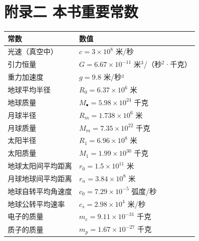 \chapter{附录二
本书重要常数}\label{ux9644ux5f55ux4e8c-ux672cux4e66ux91cdux8981ux5e38ux6570}

{\def\LTcaptype{none} %
\begin{longtable}[]{@{}
  >{\raggedright\arraybackslash}p{}
  >{\raggedright\arraybackslash}p{}@{}}
\toprule\noalign{}
\begin{minipage}[b]{\linewidth}\raggedright
常数
\end{minipage} & \begin{minipage}[b]{\linewidth}\raggedright
数值
\end{minipage} \\
\midrule\noalign{}
\endhead
\bottomrule\noalign{}
\endlastfoot
光速（真空中） & \(c = 3 \times 10^{8}\) 米/秒 \\
引力恒量 & \(G = 6.67 \times 10^{-11}\)
米\(^{3}\)/（秒\(^{2}\)·千克） \\
重力加速度 & \(g = 9.8\) 米/秒² \\
地球平均半径 & \(R_{0} = 6.37 \times 10^{6}\) 米 \\
地球质量 & \(M_{\bullet} = 5.98 \times 10^{24}\) 千克 \\
月球半径 & \(R_{m} = 1.738 \times 10^{6}\) 米 \\
月球质量 & \(M_{m} = 7.35 \times 10^{22}\) 千克 \\
太阳半径 & \(R_{1} = 6.96 \times 10^{8}\) 米 \\
太阳质量 & \(M_{1} = 1.99 \times 10^{30}\) 千克 \\
地球太阳间平均距离 & \(r_{0} = 1.5 \times 10^{11}\) 米 \\
月球地球间平均距离 & \(r_{n} = 3.84 \times 10^{8}\) 米 \\
地球自转平均角速度 & \(c_{0} = 7.29 \times 10^{-5}\) 弧度/秒 \\
地球公转平均速率 & \(c_{s} = 2.98 \times 10^{4}\) 米/秒 \\
电子的质量 & \(m_{c} = 9.11 \times 10^{-31}\) 千克 \\
质子的质量 & \(m_{p} = 1.67 \times 10^{-27}\) 千克 \\
\end{longtable}
}
